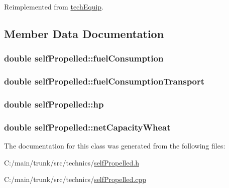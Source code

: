 Reimplemented from \hyperlink{classtech_equip_a7b8543a8ead2be2a6a00d80123895e2c}{techEquip}.

\subsection{Member Data Documentation}
\hypertarget{classself_propelled_ab2bd8685f92cad33b3a6c843fbacfbab}{
\subsubsection[{fuelConsumption}]{\setlength{\rightskip}{0pt plus 5cm}double {\bf selfPropelled::fuelConsumption}}}
\label{classself_propelled_ab2bd8685f92cad33b3a6c843fbacfbab}
\hypertarget{classself_propelled_a1e3f848c150f5969e36345d61ca5acfe}{
\subsubsection[{fuelConsumptionTransport}]{\setlength{\rightskip}{0pt plus 5cm}double {\bf selfPropelled::fuelConsumptionTransport}}}
\label{classself_propelled_a1e3f848c150f5969e36345d61ca5acfe}
\hypertarget{classself_propelled_a946a2297532c377175592ef3ffc57b59}{
\subsubsection[{hp}]{\setlength{\rightskip}{0pt plus 5cm}double {\bf selfPropelled::hp}}}
\label{classself_propelled_a946a2297532c377175592ef3ffc57b59}
\hypertarget{classself_propelled_a162544cbfaae0d03a62e7412eb5fd602}{
\subsubsection[{netCapacityWheat}]{\setlength{\rightskip}{0pt plus 5cm}double {\bf selfPropelled::netCapacityWheat}}}
\label{classself_propelled_a162544cbfaae0d03a62e7412eb5fd602}


The documentation for this class was generated from the following files:\begin{DoxyCompactItemize}
\item 
C:/main/trunk/src/technics/\hyperlink{self_propelled_8h}{selfPropelled.h}\item 
C:/main/trunk/src/technics/\hyperlink{self_propelled_8cpp}{selfPropelled.cpp}\end{DoxyCompactItemize}

